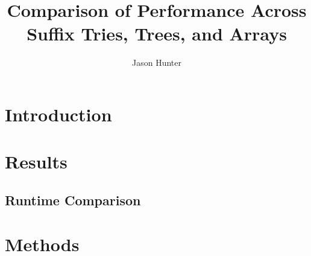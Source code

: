 \documentclass[11pt, letterpaper]{article}
\begin{document}
\title{Comparison of Performance Across Suffix Tries, Trees, and Arrays}
\author{Jason Hunter}
\maketitle

\section{Introduction}

\section{Results}


\subsection{Runtime Comparison}





\section{Methods}

\subsection{}
\end{document}
